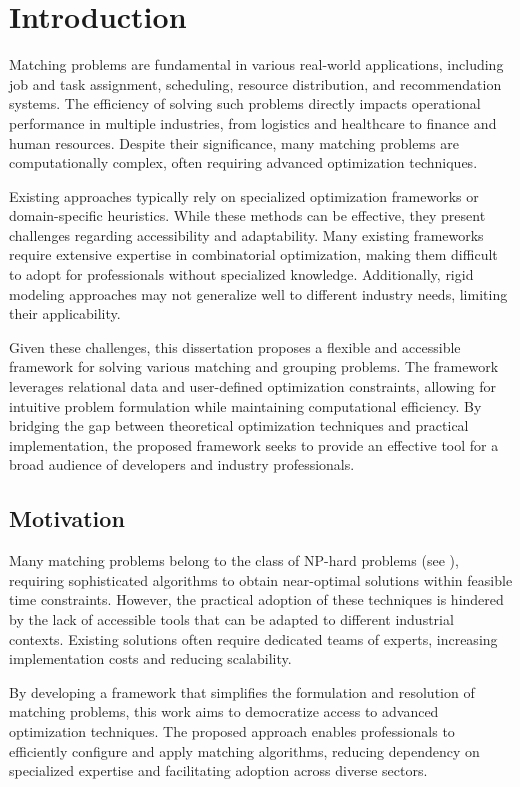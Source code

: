 \chapter{Introduction} \label{chap:introduction}

Matching problems are fundamental in various real-world applications, including job and task assignment, scheduling, resource distribution, and recommendation systems. The efficiency of solving such problems directly impacts operational performance in multiple industries, from logistics and healthcare to finance and human resources. Despite their significance, many matching problems are computationally complex, often requiring advanced optimization techniques.

Existing approaches typically rely on specialized optimization frameworks or domain-specific heuristics. While these methods can be effective, they present challenges regarding accessibility and adaptability. Many existing frameworks require extensive expertise in combinatorial optimization, making them difficult to adopt for professionals without specialized knowledge. Additionally, rigid modeling approaches may not generalize well to different industry needs, limiting their applicability.

Given these challenges, this dissertation proposes a flexible and accessible framework for solving various matching and grouping problems. The framework leverages relational data and user-defined optimization constraints, allowing for intuitive problem formulation while maintaining computational efficiency. By bridging the gap between theoretical optimization techniques and practical implementation, the proposed framework seeks to provide an effective tool for a broad audience of developers and industry professionals.

\section{Motivation}
Many matching problems belong to the class of NP-hard problems (see \cite{karp1972reducibility}), requiring sophisticated algorithms to obtain near-optimal solutions within feasible time constraints. However, the practical adoption of these techniques is hindered by the lack of accessible tools that can be adapted to different industrial contexts. Existing solutions often require dedicated teams of experts, increasing implementation costs and reducing scalability.

By developing a framework that simplifies the formulation and resolution of matching problems, this work aims to democratize access to advanced optimization techniques. The proposed approach enables professionals to efficiently configure and apply matching algorithms, reducing dependency on specialized expertise and facilitating adoption across diverse sectors.

